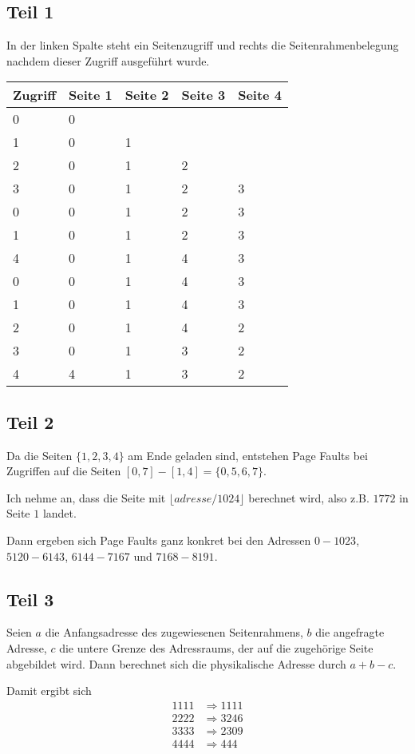 \documentclass[10pt,a4paper]{article}
\begin{document}
\subsection*{Teil 1}

In der linken Spalte steht ein Seitenzugriff und rechts die Seitenrahmenbelegung nachdem dieser Zugriff ausgeführt wurde.

\begin{tabular}{|l|l|l|l|l|}
\hline
Zugriff & Seite 1 & Seite 2 & Seite 3 & Seite 4\\
\hline
0 & 0 & & &\\
1 & 0 & 1 & &\\
2 & 0 & 1 & 2 &\\
3 & 0 & 1 & 2 & 3\\
0 & 0 & 1 & 2 & 3\\
1 & 0 & 1 & 2 & 3\\
4 & 0 & 1 & 4 & 3\\
0 & 0 & 1 & 4 & 3\\
1 & 0 & 1 & 4 & 3\\
2 & 0 & 1 & 4 & 2\\
3 & 0 & 1 & 3 & 2\\
4 & 4 & 1 & 3 & 2
\end{tabular}

\subsection*{Teil 2}

Da die Seiten $\{1, 2, 3, 4\}$ am Ende geladen sind, entstehen Page Faults bei Zugriffen auf die Seiten $[0, 7] - [1, 4] = \{0, 5, 6, 7\}$.

Ich nehme an, dass die Seite mit $\lfloor adresse / 1024 \rfloor$ berechnet wird, also z.B. $1772$ in Seite $1$ landet.

Dann ergeben sich Page Faults ganz konkret bei den Adressen $0 - 1023$, $5120 - 6143$, $6144 - 7167$ und $7168 - 8191$.

\subsection*{Teil 3}

Seien $a$ die Anfangsadresse des zugewiesenen Seitenrahmens, $b$ die angefragte Adresse, $c$ die untere Grenze des Adressraums, der auf die zugehörige Seite abgebildet wird.
Dann berechnet sich die physikalische Adresse durch $a + b - c$.

Damit ergibt sich
\begin{align}
1111 & \Rightarrow 1111\\
2222 & \Rightarrow 3246\\
3333 & \Rightarrow 2309\\
4444 & \Rightarrow 444
\end{align}
\end{document}
